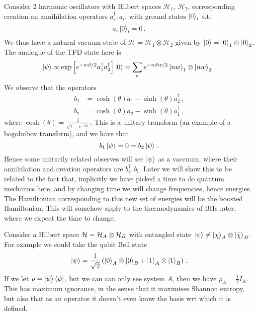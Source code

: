 \documentclass{article}
\begin{document}
\begin{remark}
	Consider 2 harmonic oscillators with Hilbert spaces $\mathcal{H}_1, \, \mathcal{H}_2$, corresponding creation an annihilation operators $a_i^\dagger, a_i$, with ground states $\ket{0}_i$ s.t. 
	\[
	a_i \ket{0}_i = 0 \, .
	\] 
	We thus have a natural vacuum state of $\mathcal{H} = \mathcal{H}_1 \otimes \mathcal{H}_2$ given by $\ket{0} = \ket{0}_1 \otimes \ket{0}_2$. The analogue of the TFD state here is 
	\[
	\ket{\psi} \propto \exp\left[ e^{-w \beta/2} a^\dagger_1 a^\dagger_2 \right] \ket{0} = \sum_n e^{-n\beta w/2 }\ket{nw}_1 \otimes \ket{nw}_2 \, .
	\]
	We observe that the operators 
	\begin{align*}
		b_1 &= \cosh(\theta) a_1 - \sinh(\theta) a_2^\dagger \, , \\
		b_2 &= \cosh(\theta) a_2 - \sinh(\theta) a_1^\dagger \, ,
	\end{align*}
where $\cosh(\theta) = \frac{1}{\sqrt{1-e^{-\beta w}}}$. This is a unitary transform (an example of a bogoluibov transform), and we have that 
\[
b_1 \ket{\psi} = 0 = b_2 \ket{\psi} \, . 
\]
Hence some unitarily related observes will see $\ket{\psi}$ as a vaccuum, where their annihilation and creation operators are $b_i^\dagger, b_i$. Later we will show this to be related to the fact that, implicitly we have picked a time to do quantum mechanics here, and by changing time we will change frequencies, hence energies. The Hamiltonian corresponding to this new set of energies will be the boosted Hamiltonian. This will somehow apply to the thermodynamics of BHs later, where we expect the time to change. 
\end{remark}

\begin{remark}
	Consider a Hilbert space $\mathcal{H} = \mathcal{H}_A \otimes \mathcal{H}_B$ with entangled state $\ket{\psi} \neq \ket{\chi}_A \otimes \ket{\tilde{\chi}}_B$. For example we could take the qubit Bell state 
\[
\ket{\psi} = \frac{1}{\sqrt{2}} \left( \ket{0}_A \otimes \ket{0}_B + \ket{1}_A \otimes \ket{1}_B \right) \, .
\]
If we let $\rho = \ket{\psi} \bra{\psi}$, but we can can only see system $A$, then we have $\rho_A = \frac{1}{2} I_A$. This has maximum ignorance, in the sense that it maximises Shannon entropy, but also that as an operator it doesn't even know the basis wrt which it is defined.  
\end{remark}
\end{document}
